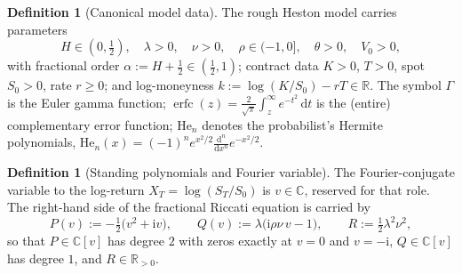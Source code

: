 \documentclass[11pt]{article}
\DeclareMathOperator{\erfc}{erfc}
\newcommand{\C}{\mathbb{C}}
\newcommand{\R}{\mathbb{R}}
\newcommand{\Ii}{\mathrm{i}}
\newcommand{\dd}{\mathrm{d}}
\newcommand{\Herm}{\mathrm{He}}
\theoremstyle{plain}
\theoremstyle{definition}
\newtheorem{definition}[theorem]{Definition}
\theoremstyle{remark}
\begin{document}
\begin{definition}[Canonical model data]\label{def:model}
The rough Heston model carries parameters
\[
   H\in(0,\tfrac12),\quad \lambda>0,\quad \nu>0,\quad \rho\in(-1,0],\quad
   \theta>0,\quad V_0>0,
\]
with fractional order $\alpha:=H+\tfrac12\in(\tfrac12,1)$; contract data $K>0$,
$T>0$, spot $S_0>0$, rate $r\ge0$; and log-moneyness $k:=\log(K/S_0)-rT\in\R$.
The symbol $\Gamma$ is the Euler gamma function; $\erfc(z)=\tfrac{2}{\sqrt\pi}\int_z^\infty
e^{-t^2}\,\dd t$ is the (entire) complementary error function; $\Herm_n$ denotes
the probabilist's Hermite polynomials, $\Herm_n(x)=(-1)^n e^{x^2/2}\frac{\dd^n}{\dd x^n}e^{-x^2/2}$.
\end{definition}

\begin{definition}[Standing polynomials and Fourier variable]\label{def:PQR}
The Fourier-conjugate variable to the log-return $X_T=\log(S_T/S_0)$ is
$v\in\C$, reserved for that role. The right-hand side of the fractional Riccati
equation is carried by
\begin{equation}\label{eq:PQR}
   P(v):=-\tfrac12\bigl(v^2+\Ii v\bigr),\qquad
   Q(v):=\lambda\bigl(\Ii\rho\nu\,v-1\bigr),\qquad
   R:=\tfrac12\lambda^2\nu^2,
\end{equation}
so that $P\in\C[v]$ has degree $2$ with zeros exactly at $v=0$ and $v=-\Ii$,
$Q\in\C[v]$ has degree $1$, and $R\in\R_{>0}$.
\end{definition}
\end{document}
